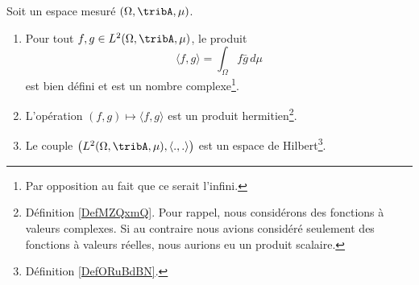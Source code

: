 \begin{lemma}   \label{LemIVWooZyWodb}
	Soit un espace mesuré \( (\Omega,\tribA,\mu)\).
	\begin{enumerate}
		\item
		      Pour tout \( f,g\in L^2(\Omega,\tribA,\mu)\), le produit
		      \begin{equation}        \label{EQooGLVUooObPmaX}
			      \langle f, g\rangle =\int_{\Omega}f\bar g\,d\mu
		      \end{equation}
		      est bien défini et est un nombre complexe\footnote{Par opposition au fait que ce serait l'infini.}.
		\item
		      L'opération \( (f,g)\mapsto \langle f, g\rangle \) est un produit hermitien\footnote{Définition \ref{DefMZQxmQ}. Pour rappel, nous considérons des fonctions à valeurs complexes. Si au contraire nous avions considéré seulement des fonctions à valeurs réelles, nous aurions eu un produit scalaire.}.
		\item
		      Le couple \( \big( L^2(\Omega,\tribA,\mu),\langle ., .\rangle  \big)\) est un espace de Hilbert\footnote{Définition \ref{DefORuBdBN}.}.
	\end{enumerate}
\end{lemma}

